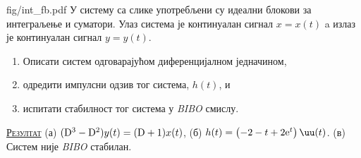 \begin{slikaDesno}{fig/int_fb.pdf}
\PID У систему са слике употребљени су идеални
блокови за интеграљење и суматори. Улаз система  
је континуалан сигнал $x = x(t)$ a излаз је 
континуалан сигнал $y = y(t)$. 
\end{slikaDesno}
\begin{enumerate}[label=(\alph*)]
    \item Описати 
    систем одговарајућом диференцијалном једначином,
    \item одредити импулсни одзив тог система,  $h(t)$, и
    \item испитати стабилност тог система
    у \textit{BIBO} смислу.
\end{enumerate}
\vspace*{2mm}

\textsc{\underline{Резултат}} 
(а) $({\rm D}^3 - {\rm D}^2) y(t) = 
({\rm D} + 1) x(t)$, 
\quad
(б) $h(t) = 
\bigl(
-2-t+2{\rm e}^t
\bigr)
\,\uu(t)$.
\quad
(в) Систем није 
\textit{BIBO}
стабилан.
